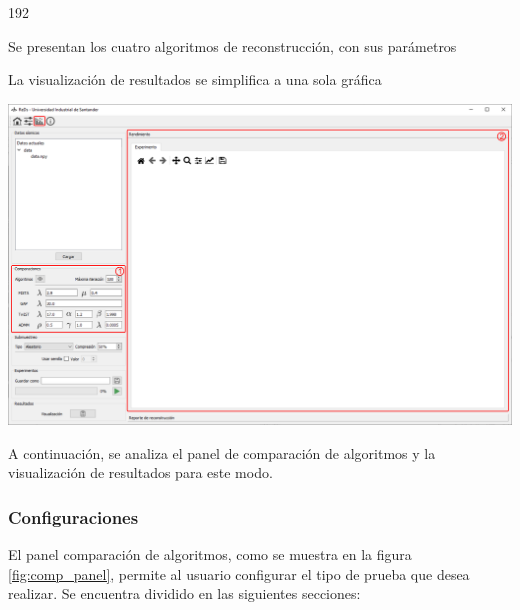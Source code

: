 \documentclass[12pt,twoside,letter]{ol-softwaremanual}
\newenvironment{Figure}
  {\par\medskip\noindent\minipage{\linewidth}}
  {\endminipage\par\medskip}
\begin{document}
\begin{dingautolist}{192}
	\setlength\itemsep{0em}
	\item Se presentan los cuatro algoritmos de reconstrucción, con sus parámetros
	\item La visualización de resultados se simplifica a una sola gráfica
\end{dingautolist}

\begin{Figure}
	\centering
	\includegraphics[width=0.85\linewidth]{main-comp.png}
	\label{fig:main-comp}
\end{Figure}

A continuación, se analiza el panel de comparación de algoritmos y la visualización de resultados para este modo.

\subsubsection{Configuraciones}

El panel comparación de algoritmos, como se muestra en la figura \ref{fig:comp_panel}, permite al usuario configurar el tipo de prueba que desea realizar. Se encuentra dividido en las siguientes secciones:
\end{document}
